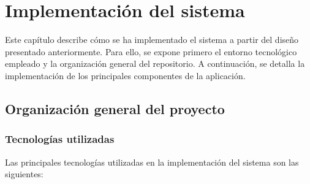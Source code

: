 \chapter{Implementación del sistema}
\label{chap:implementacion-sistema}

Este capítulo describe cómo se ha implementado el sistema a partir del diseño presentado anteriormente. Para ello, se expone primero el entorno tecnológico empleado y la organización general del repositorio. A continuación, se detalla la implementación de los principales componentes de la aplicación.


\section{Organización general del proyecto}
\label{sec:organizacion-general-proyecto}

\subsection{Tecnologías utilizadas}

Las principales tecnologías utilizadas en la implementación del sistema son las siguientes:

